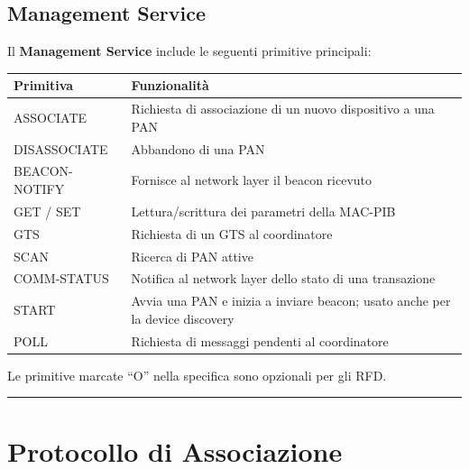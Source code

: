 \documentclass[
  italian,
  openany]{book}
\newcounter{none} %
\begin{document}
\subsection{Management Service}\label{management-service}

Il \textbf{Management Service} include le seguenti primitive principali:

{\def\LTcaptype{none} %
\begin{longtable}[]{@{}
  >{\raggedright\arraybackslash}p{}
  >{\raggedright\arraybackslash}p{}@{}}
\toprule\noalign{}
\begin{minipage}[b]{\linewidth}\raggedright
Primitiva
\end{minipage} & \begin{minipage}[b]{\linewidth}\raggedright
Funzionalità
\end{minipage} \\
\midrule\noalign{}
\endhead
\bottomrule\noalign{}
\endlastfoot
ASSOCIATE & Richiesta di associazione di un nuovo dispositivo a una
PAN \\
DISASSOCIATE & Abbandono di una PAN \\
BEACON-NOTIFY & Fornisce al network layer il beacon ricevuto \\
GET / SET & Lettura/scrittura dei parametri della MAC-PIB \\
GTS & Richiesta di un GTS al coordinatore \\
SCAN & Ricerca di PAN attive \\
COMM-STATUS & Notifica al network layer dello stato di una
transazione \\
START & Avvia una PAN e inizia a inviare beacon; usato anche per la
device discovery \\
POLL & Richiesta di messaggi pendenti al coordinatore \\
\end{longtable}
}

Le primitive marcate ``O'' nella specifica sono opzionali per gli RFD.

\begin{center}\rule{0.5\linewidth}{0.5pt}\end{center}

\section{Protocollo di Associazione}\label{protocollo-di-associazione}
\end{document}
